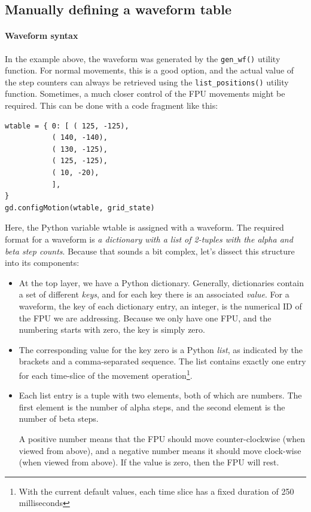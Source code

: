 \documentclass[fontsize=12,a4paper]{scrreprt}
\begin{document}
\subsection{Manually defining a waveform table}
\label{sec:waveform_rules}
\paragraph{Waveform syntax}

In the example above, the waveform was generated by the
\texttt{gen\_wf()} utility function.  For normal movements, this is a
good option, and the actual value of the step counters can always be
retrieved using the \texttt{list\_positions()} utility
function. Sometimes, a much closer control of the FPU movements might
be required. This can be done with a code fragment like this:

\begin{verbatim}
wtable = { 0: [ ( 125, -125),
           ( 140, -140),
           ( 130, -125),
           ( 125, -125),
           ( 10, -20),
           ],
}
gd.configMotion(wtable, grid_state)
\end{verbatim}

Here, the Python variable wtable is assigned with
a waveform. The required format for a waveform
is \emph{a dictionary with a list of 2-tuples
  with the alpha and beta step counts}. Because
that sounds a bit complex, let's dissect this
structure into its components:

\begin{itemize}

\item At the top layer, we have a Python dictionary. Generally,
  dictionaries contain a set of different \emph{keys}, and for each
  key there is an associated \emph{value}. For a waveform, the key of
  each dictionary entry, an integer, is the numerical ID of the FPU we
  are addressing.  Because we only have one FPU, and the numbering
  starts with zero, the key is simply zero.

\item The corresponding value for the key zero is a Python
  \emph{list}, as indicated by the brackets and a comma-separated
  sequence. The list contains exactly one entry for each time-slice of
  the movement operation\footnote{With the current default values,
    each time slice has a fixed duration of 250 milliseconds}.

\item Each list entry is a tuple with two elements, both of which are
  numbers. The first element is the number of alpha steps, and the
  second element is the number of beta steps.

  A positive number means that the FPU should move counter-clockwise
  (when viewed from above), and a negative number means it should move
  clock-wise (when viewed from above). If the value is zero, then the
  FPU will rest.

\end{itemize}
\end{document}
